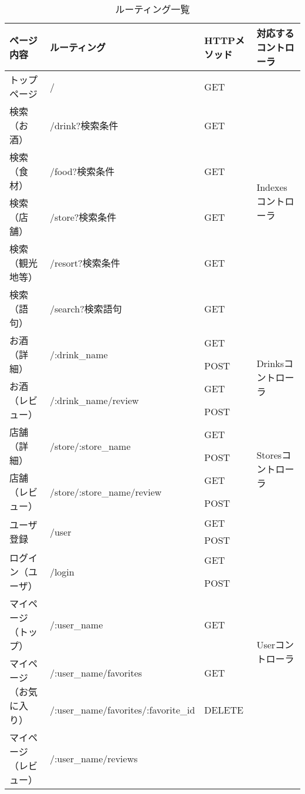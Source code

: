 \documentclass[a4j,titlepage]{jarticle}
\begin{document}
\begin{table}[!htbp]
\caption{ルーティング一覧}
\label{routing}
\small
\begin{center}
\begin{tabular}{|l|l|l|p{4cm}|}\hline
ページ内容 & ルーティング & HTTPメソッド & 対応するコントローラ\\\hline\hline
トップページ & / & GET & \multirow{6}{*}{Indexesコントローラ} \\\cline{1-3}
検索（お酒） & /drink?検索条件 & GET & \\\cline{1-3}
検索（食材） & /food?検索条件 & GET & \\\cline{1-3}
検索（店舗） & /store?検索条件 & GET &  \\\cline{1-3}
検索（観光地等） & /resort?検索条件 & GET & \\\cline{1-3}
検索（語句） & /search?検索語句 & GET & \\\hline
\multirow{2}{*}{お酒（詳細）} & \multirow{2}{*}{/:drink\_name}
& GET & \multirow{4}{*}{Drinksコントローラ} \\\cline{3-3}
 & & POST &  \\\cline{1-3}
\multirow{2}{*}{お酒（レビュー）} & \multirow{2}{*}{/:drink\_name/review}
& GET & \\\cline{3-3}
 & & POST & \\\hline
\multirow{2}{*}{店舗（詳細）} & \multirow{2}{*}{/store/:store\_name}
& GET & \multirow{4}{*}{Storesコントローラ} \\\cline{3-3}
 & & POST &  \\\cline{1-3}
\multirow{2}{*}{店舗（レビュー）}& \multirow{2}{*}{/store/:store\_name/review}
& GET &  \\\cline{3-3}
 & & POST &\\\hline
\multirow{2}{*}{ユーザ登録} & \multirow{2}{*}{/user}
& GET & \multirow{12}{*}{Userコントローラ} \\\cline{3-3}
 & & POST & \\\cline{1-3}
 \multirow{2}{*}{ログイン（ユーザ）} & \multirow{2}{*}{/login}
 & GET & \\\cline{3-3}
 & & POST & \\\cline{1-3}
マイページ（トップ） & /:user\_name
& GET & \\\cline{1-3}
\multirow{2}{*}{マイページ（お気に入り）} & /:user\_name/favorites
& GET & \\\cline{2-3}
 & /:user\_name/favorites/:favorite\_id & DELETE & \\\cline{1-3}
\multirow{2}{*}{マイページ（レビュー）} & /:user\_name/reviews

\end{tabular}
\end{center}
\end{table}
\end{document}
